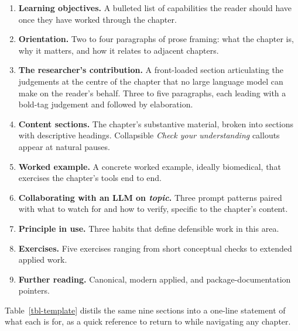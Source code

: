 \documentclass[
  letterpaper,
  11pt]{scrbook}
\providecommand{\tightlist}{%
  \setlength{\itemsep}{0pt}\setlength{\parskip}{0pt}}
\begin{document}
\begin{enumerate}
\def\labelenumi{\arabic{enumi}.}
\tightlist
\item
  \textbf{Learning objectives.} A bulleted list of capabilities the
  reader should have once they have worked through the chapter.
\item
  \textbf{Orientation.} Two to four paragraphs of prose framing: what
  the chapter is, why it matters, and how it relates to adjacent
  chapters.
\item
  \textbf{The researcher's contribution.} A front-loaded section
  articulating the judgements at the centre of the chapter that no large
  language model can make on the reader's behalf. Three to five
  paragraphs, each leading with a bold-tag judgement and followed by
  elaboration.
\item
  \textbf{Content sections.} The chapter's substantive material, broken
  into sections with descriptive headings. Collapsible \emph{Check your
  understanding} callouts appear at natural pauses.
\item
  \textbf{Worked example.} A concrete worked example, ideally
  biomedical, that exercises the chapter's tools end to end.
\item
  \textbf{Collaborating with an LLM on \emph{topic}.} Three prompt
  patterns paired with what to watch for and how to verify, specific to
  the chapter's content.
\item
  \textbf{Principle in use.} Three habits that define defensible work in
  this area.
\item
  \textbf{Exercises.} Five exercises ranging from short conceptual
  checks to extended applied work.
\item
  \textbf{Further reading.} Canonical, modern applied, and
  package-documentation pointers.
\end{enumerate}

Table~\ref{tbl-template} distils the same nine sections into a one-line
statement of what each is for, as a quick reference to return to while
navigating any chapter.
\end{document}
